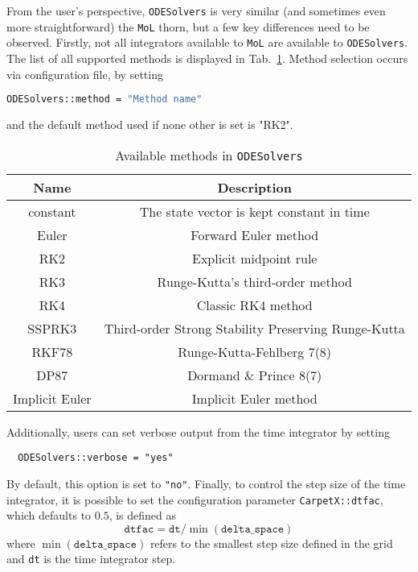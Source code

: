 From the user's perspective, \texttt{ODESolvers} is very similar (and sometimes even more straightforward) the \texttt{MoL} thorn, but a few key differences need to be observed. Firstly, not all integrators available to \texttt{MoL} are available to \texttt{ODESolvers}. The list of all supported methods is displayed in Tab.~\ref{tab:odesolvers_methods}. Method selection occurs via configuration file, by setting
%
\begin{lstlisting}[language=bash]
  ODESolvers::method = "Method name"
\end{lstlisting}
%
and the default method used if none other is set is "RK2".

\begin{table}[]
  \centering
  \begin{tabular}{cc}
  Name           & Description                                         \\ \hline\hline
  constant       & The state vector is kept constant in time           \\
  Euler          & Forward Euler method                                \\
  RK2            & Explicit midpoint rule                              \\
  RK3            & Runge-Kutta's third-order method                    \\
  RK4            & Classic RK4 method                                  \\
  SSPRK3         & Third-order Strong Stability Preserving Runge-Kutta \\
  RKF78          & Runge-Kutta-Fehlberg 7(8)                           \\
  DP87           & Dormand \& Prince 8(7)                              \\
  Implicit Euler & Implicit Euler method                               \\ \hline\hline
  \end{tabular}
  \caption{Available methods in \texttt{ODESolvers}}
  \label{tab:odesolvers_methods}
\end{table}

Additionally, users can set verbose output from the time integrator by setting
%
\begin{lstlisting}
  ODESolvers::verbose = "yes"
\end{lstlisting}
%
By default, this option is set to \texttt{"no"}. Finally, to control the step size of the time integrator, it is possible to set the configuration parameter \texttt{CarpetX::dtfac}, which defaults to $0.5$, is defined as
%
\begin{equation}
  \texttt{dtfac} = \texttt{dt}/\min(\texttt{delta\_space})
\end{equation}
%
where $\min(\texttt{delta\_space})$ refers to the smallest step size defined in the \CarpetX\space grid and \texttt{dt} is the time integrator step.


